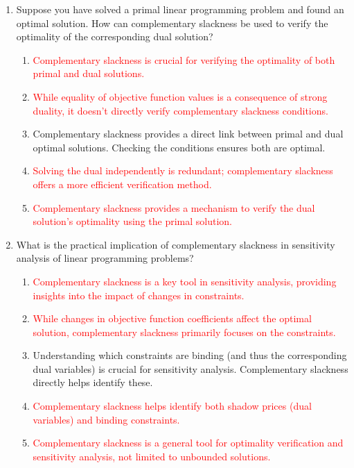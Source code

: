 \documentclass{article}%
\newcommand{\incorrect}[1]{\textcolor{red}{#1}}
\begin{document}
\begin{enumerate}
\begin{enumerate}
\end{enumerate}%
\vspace{1em}%
\item Suppose you have solved a primal linear programming problem and found an optimal solution. How can complementary slackness be used to verify the optimality of the corresponding dual solution?%
\begin{enumerate}%
\item \incorrect{Complementary slackness is crucial for verifying the optimality of both primal and dual solutions.}%
\item \incorrect{While equality of objective function values is a consequence of strong duality, it doesn't directly verify complementary slackness conditions.}%
\item Complementary slackness provides a direct link between primal and dual optimal solutions.  Checking the conditions ensures both are optimal.%
\item \incorrect{Solving the dual independently is redundant; complementary slackness offers a more efficient verification method.}%
\item \incorrect{Complementary slackness provides a mechanism to verify the dual solution's optimality using the primal solution.}%
\end{enumerate}%
\vspace{1em}%
\item What is the practical implication of complementary slackness in sensitivity analysis of linear programming problems?%
\begin{enumerate}%
\item \incorrect{Complementary slackness is a key tool in sensitivity analysis, providing insights into the impact of changes in constraints.}%
\item \incorrect{While changes in objective function coefficients affect the optimal solution, complementary slackness primarily focuses on the constraints.}%
\item Understanding which constraints are binding (and thus the corresponding dual variables) is crucial for sensitivity analysis. Complementary slackness directly helps identify these.%
\item \incorrect{Complementary slackness helps identify both shadow prices (dual variables) and binding constraints.}%
\item \incorrect{Complementary slackness is a general tool for optimality verification and sensitivity analysis, not limited to unbounded solutions.}%
\end{enumerate}%

\end{enumerate}
\end{document}
